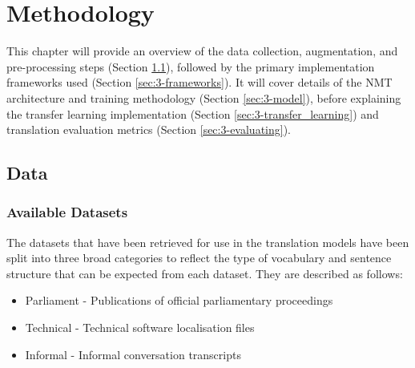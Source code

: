 \chapter{Methodology}

This chapter will provide an overview of the data collection, augmentation, and pre-processing steps (Section \ref{sec:3-data}), followed by the primary implementation frameworks used (Section \ref{sec:3-frameworks}). It will cover details of the \acrshort{NMT} architecture and training methodology (Section \ref{sec:3-model}), before explaining the transfer learning implementation (Section \ref{sec:3-transfer_learning}) and translation evaluation metrics (Section \ref{sec:3-evaluating}).



\newpage

\section{Data}
\label{sec:3-data}
\subsection{Available Datasets}


The datasets that have been retrieved for use in the translation models have been split into three broad categories to reflect the type of vocabulary and sentence structure that can be expected from each dataset. They are described as follows:

\begin{itemize}
    \item Parliament - Publications of official parliamentary proceedings
    \item Technical - Technical software localisation files
    \item Informal - Informal conversation transcripts
\end{itemize}


